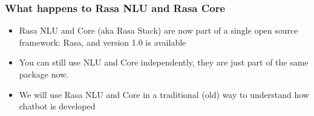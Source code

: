  \begin{frame}[fragile]\frametitle{What happens to Rasa NLU and Rasa Core}
\begin{itemize}
\item Rasa NLU and Core (aka Rasa Stack) are now part of a single open source framework: Rasa, and version 1.0 is available
\item You can still use NLU and Core independently, they are just part of the same package now.
\item We will use Rasa NLU and Core in a traditional (old) way to understand how chatbot is developed
\end{itemize}
\end{frame}


